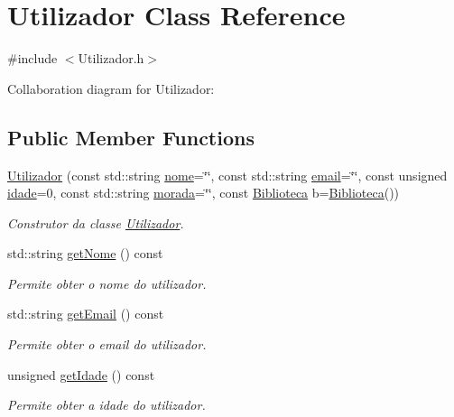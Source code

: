 \hypertarget{class_utilizador}{}\section{Utilizador Class Reference}
\label{class_utilizador}


{\ttfamily \#include $<$Utilizador.\+h$>$}



Collaboration diagram for Utilizador\+:
\subsection*{Public Member Functions}
\begin{DoxyCompactItemize}
\item 
\mbox{\hyperlink{class_utilizador_ac4d4e41d09c17ea0b1c5bf4bcda4b6a8}{Utilizador}} (const std\+::string \mbox{\hyperlink{class_utilizador_ace8fd0a2f9414413e2966c8366e62b19}{nome}}=\char`\"{}\char`\"{}, const std\+::string \mbox{\hyperlink{class_utilizador_a3663b1ff4632d292c0b3476a960c06a7}{email}}=\char`\"{}\char`\"{}, const unsigned \mbox{\hyperlink{class_utilizador_a6bbed097ba3eeeae71b777b30b478ec2}{idade}}=0, const std\+::string \mbox{\hyperlink{class_utilizador_ab94b7e2f13eb757c2cb98104fc69ac8c}{morada}}=\char`\"{}\char`\"{}, const \mbox{\hyperlink{class_biblioteca}{Biblioteca}} b=\mbox{\hyperlink{class_biblioteca}{Biblioteca}}())
\begin{DoxyCompactList}\small\item\em Construtor da classe \mbox{\hyperlink{class_utilizador}{Utilizador}}. \end{DoxyCompactList}\item 
std\+::string \mbox{\hyperlink{class_utilizador_a82874cffab116aa572f58576511b0e24}{get\+Nome}} () const
\begin{DoxyCompactList}\small\item\em Permite obter o nome do utilizador. \end{DoxyCompactList}\item 
std\+::string \mbox{\hyperlink{class_utilizador_aea88bb297704762d0cccc909b8c2da54}{get\+Email}} () const
\begin{DoxyCompactList}\small\item\em Permite obter o email do utilizador. \end{DoxyCompactList}\item 
unsigned \mbox{\hyperlink{class_utilizador_adff93f098f9512263fcbd1cdadf20855}{get\+Idade}} () const
\begin{DoxyCompactList}\small\item\em Permite obter a idade do utilizador. \end{DoxyCompactList}\item 

\end{DoxyCompactItemize}
